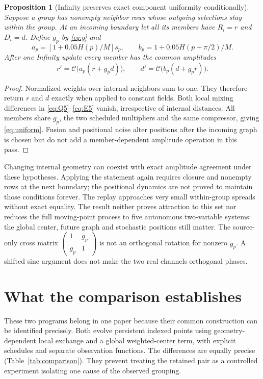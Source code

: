 \documentclass[11pt,a4paper]{article}
\newtheorem{proposition}{Proposition}
\newcommand{\C}{\mathcal{C}}
\begin{document}
\begin{proposition}[Infinity preserves exact component uniformity conditionally]\label{prop:uniform}
Suppose a group has nonempty neighbor rows whose outgoing selections stay within the group. At an incoming boundary let all its members have $R_i=r$ and $D_i=d$. Define $g_p$ by \eqref{eq:g} and
\begin{equation}
a_p=[1+0.05H(p)/M]s_p,\qquad b_p=1+0.05H(p+\pi/2)/M.\label{eq:ab5}
\end{equation}
After one Infinity update every member has the common amplitudes
\begin{equation}
r'=\C\big(a_p(r+g_pd)\big),\qquad
d'=\C\big(b_p(d+g_pr)\big).\label{eq:uniform}
\end{equation}
\end{proposition}
\begin{proof}
Normalized weights over internal neighbors sum to one. They therefore return $r$ and $d$ exactly when applied to constant fields. Both local mixing differences in \eqref{eq:Q5}--\eqref{eq:E5} vanish, irrespective of internal distances. All members share $g_p$, the two scheduled multipliers and the same compressor, giving \eqref{eq:uniform}. Fusion and positional noise alter positions after the incoming graph is chosen but do not add a member-dependent amplitude operation in this pass.
\end{proof}
Changing internal geometry can coexist with exact amplitude agreement under these hypotheses. Applying the statement again requires closure and nonempty rows at the next boundary; the positional dynamics are not proved to maintain those conditions forever. The replay approaches very small within-group spreads without exact equality. The result neither proves attraction to this set nor reduces the full moving-point process to five autonomous two-variable systems: the global center, future graph and stochastic positions still matter. The source-only cross matrix $\left(\begin{smallmatrix}1&g_p\\g_p&1\end{smallmatrix}\right)$ is not an orthogonal rotation for nonzero $g_p$. A shifted sine argument does not make the two real channels orthogonal phases.

\section{What the comparison establishes}
\label{sec:comparison}
These two programs belong in one paper because their common construction can be identified precisely. Both evolve persistent indexed points using geometry-dependent local exchange and a global weighted-center term, with explicit schedules and separate observation functions. The differences are equally precise (Table~\ref{tab:comparison}). They prevent treating the retained pair as a controlled experiment isolating one cause of the observed grouping.
\end{document}
